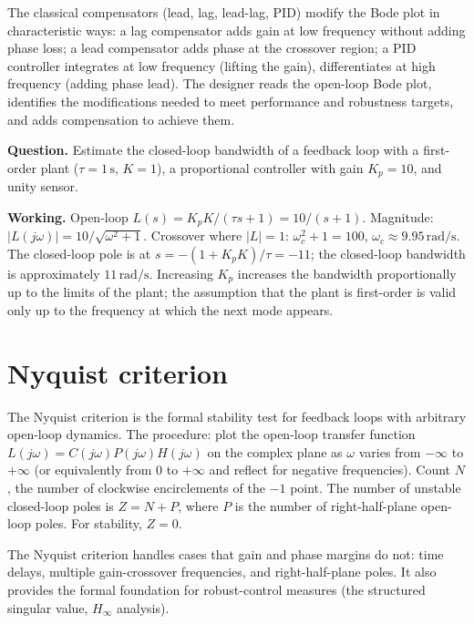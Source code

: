 The classical compensators (lead, lag, lead-lag, PID) modify the Bode plot in characteristic ways: a lag compensator adds gain at low frequency without adding phase loss; a lead compensator adds phase at the crossover region; a PID controller integrates at low frequency (lifting the gain), differentiates at high frequency (adding phase lead). The designer reads the open-loop Bode plot, identifies the modifications needed to meet performance and robustness targets, and adds compensation to achieve them.

\begin{estimation}
\textbf{Question.} Estimate the closed-loop bandwidth of a feedback loop with a first-order plant ($\tau = 1\,\text{s}$, $K = 1$), a proportional controller with gain $K_p = 10$, and unity sensor.

\textbf{Working.} Open-loop $L(s) = K_p K / (\tau s + 1) = 10/(s + 1)$. Magnitude: $|L(j\omega)| = 10/\sqrt{\omega^2 + 1}$. Crossover where $|L| = 1$: $\omega_c^2 + 1 = 100$, $\omega_c \approx 9.95\,\text{rad/s}$. The closed-loop pole is at $s = -(1 + K_p K)/\tau = -11$; the closed-loop bandwidth is approximately $11\,\text{rad/s}$. Increasing $K_p$ increases the bandwidth proportionally up to the limits of the plant; the assumption that the plant is first-order is valid only up to the frequency at which the next mode appears.
\end{estimation}

\section{Nyquist criterion}

The Nyquist criterion is the formal stability test for feedback loops with arbitrary open-loop dynamics. The procedure: plot the open-loop transfer function $L(j\omega) = C(j\omega)P(j\omega)H(j\omega)$ on the complex plane as $\omega$ varies from $-\infty$ to $+\infty$ (or equivalently from $0$ to $+\infty$ and reflect for negative frequencies). Count $N$, the number of clockwise encirclements of the $-1$ point. The number of unstable closed-loop poles is $Z = N + P$, where $P$ is the number of right-half-plane open-loop poles. For stability, $Z = 0$.

The Nyquist criterion handles cases that gain and phase margins do not: time delays, multiple gain-crossover frequencies, and right-half-plane poles. It also provides the formal foundation for robust-control measures (the structured singular value, $H_\infty$ analysis).

